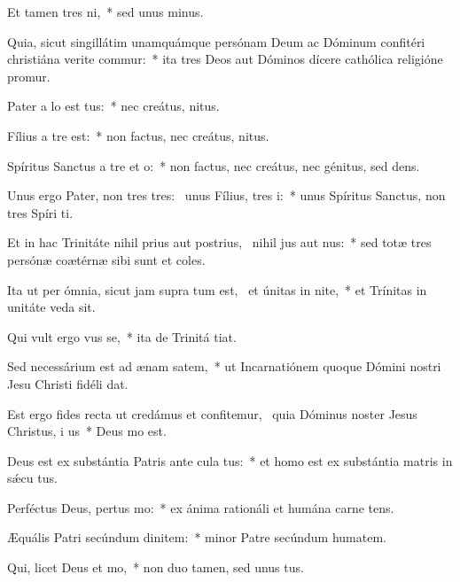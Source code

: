 \item Et tamen  tres ni,~* sed unus  minus.
\item Quia, sicut singillátim unamquámque persónam Deum ac Dóminum confitéri christiána verite commur:~* ita tres Deos aut Dóminos dícere cathólica religióne promur.
\item Pater a lo est tus:~* nec creátus,  nitus.
\item Fílius a tre  est:~* non factus, nec creátus,  nitus.
\item Spíritus Sanctus a tre et o:~* non factus, nec creátus, nec génitus, sed dens.
\item Unus ergo Pater, non tres tres:~\pscross{} unus Fílius,  tres i:~* unus Spíritus Sanctus, non tres Spíri ti.
\item Et in hac Trinitáte nihil prius aut postrius,~\pscross{} nihil jus aut nus:~* sed totæ tres persónæ coætérnæ sibi sunt et coles.
\item Ita ut per ómnia, sicut jam supra tum est,~\pscross{} et únitas in nite,~* et Trínitas in unitáte veda sit.
\item Qui vult ergo vus se,~* ita de Trinitá tiat.
\item Sed necessárium est ad ænam satem,~* ut Incarnatiónem quoque Dómini nostri Jesu Christi fidéli dat.
\item Est ergo fides recta ut credámus et confitemur,~\pscross{} quia Dóminus noster Jesus Christus, i us~* Deus  mo est.
\item Deus est ex substántia Patris ante cula tus:~* et homo est ex substántia matris in sǽcu tus.
\item Perféctus Deus, pertus mo:~* ex ánima rationáli et humána carne tens.
\item Æquális Patri secúndum dinitem:~* minor Patre secúndum humatem.
\item Qui, licet Deus  et mo,~* non duo tamen, sed unus  tus.
